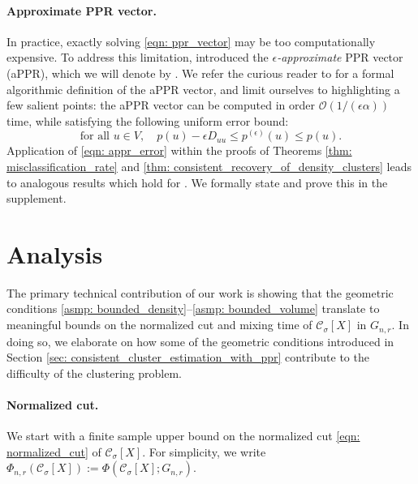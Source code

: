 \documentclass{article}
\newcommand{\1}{\mathbf{1}}
\newcommand{\pbf}{p}        %
\newcommand{\Xbf}{X}             %
\newcommand{\Dbf}{D}
\newcommand{\Cset}{\mathcal{C}}
\newcommand{\Csig}{\Cset_{\sigma}}
\theoremstyle{aldenthm}
\theoremstyle{aldenrmrk}
\begin{document}
\paragraph{Approximate PPR vector.}  In practice, exactly solving \eqref{eqn:
  ppr_vector} may be too computationally expensive. To address this limitation,
\citet{andersen2006} introduced the \emph{$\epsilon$-approximate} PPR vector
(aPPR), which we will denote by \smash{$\pbf^{(\epsilon)}$}. We refer the
curious reader to \citet{andersen2006} for a formal algorithmic definition of
the aPPR vector, and limit ourselves to highlighting a few salient points: the
aPPR vector can be computed in order $\mathcal{O}(1/(\epsilon\alpha))$ time,
while satisfying the following uniform error bound: 
\begin{equation}
\label{eqn: appr_error}
\textrm{for all $u \in V$}, \quad \pbf(u) - \epsilon \Dbf_{uu}\leq
\pbf^{(\epsilon)}(u) \leq \pbf(u).  
\end{equation}
Application of \eqref{eqn: appr_error} within the proofs of Theorems \ref{thm:
  misclassification_rate} and \ref{thm: consistent_recovery_of_density_clusters}
leads to analogous results which hold for \smash{$\pbf^{(\epsilon)}$}. We
formally state and prove this in the supplement. 

\section{Analysis}
\label{sec: analysis}

The primary technical contribution of our work is showing that the geometric
conditions \ref{asmp: bounded_density}--\ref{asmp: bounded_volume} translate to 
meaningful bounds on the normalized cut and mixing time of $\Csig[\Xbf]$ in
$G_{n,r}$. In doing so, we elaborate on how some of the geometric conditions
introduced in Section \ref{sec: consistent_cluster_estimation_with_ppr}
contribute to the difficulty of the clustering problem. 

\paragraph{Normalized cut.} We start with a finite sample upper bound on the
normalized cut \eqref{eqn: normalized_cut} of $\Cset_\sigma[\Xbf]$. For
simplicity, we write $\Phi_{n,r}(\Csig[\Xbf]) := \Phi(\Csig[\Xbf]; G_{n,r})$. 
\end{document}
